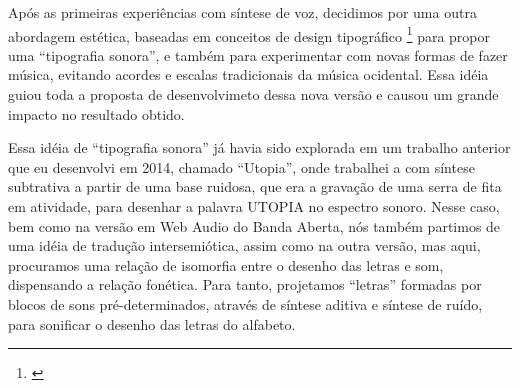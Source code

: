 Após as primeiras experiências com síntese de voz, decidimos por uma outra abordagem estética, baseadas em conceitos de design tipográfico \footnote{\cite{ruder_typography:_2009}} para propor uma ``tipografia sonora'', e também para experimentar com novas formas de fazer música, evitando acordes e escalas tradicionais da música ocidental. Essa idéia guiou toda a proposta de desenvolvimeto dessa nova versão e causou um grande impacto no resultado obtido.

Essa idéia de ``tipografia sonora'' já havia sido explorada em um trabalho anterior que eu desenvolvi em 2014, chamado ``Utopia'', onde trabalhei a com síntese subtrativa a partir de uma base ruidosa, que era a gravação de uma serra de fita em atividade, para desenhar a palavra UTOPIA no espectro sonoro. Nesse caso, bem como na versão em Web Audio do Banda Aberta, nós também partimos de uma idéia de tradução intersemiótica, assim como na outra versão, mas aqui, procuramos uma relação de isomorfia entre o desenho das letras e som, dispensando a relação fonética. Para tanto, projetamos ``letras'' formadas por blocos de sons pré-determinados, através de síntese aditiva e síntese de ruído, para sonificar o desenho das letras do alfabeto.







